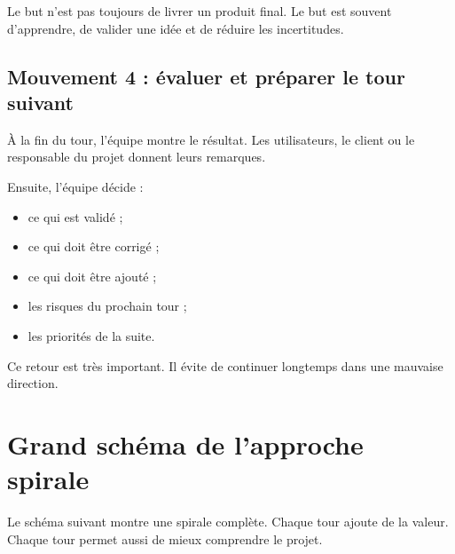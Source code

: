 \documentclass[12pt,a4paper]{article}
\begin{document}
Le but n'est pas toujours de livrer un produit final. Le but est souvent d'apprendre, de valider une idée et de réduire les incertitudes.

\subsection{Mouvement 4 : évaluer et préparer le tour suivant}

À la fin du tour, l'équipe montre le résultat. Les utilisateurs, le client ou le responsable du projet donnent leurs remarques.

Ensuite, l'équipe décide :

\begin{itemize}
    \item ce qui est validé ;
    \item ce qui doit être corrigé ;
    \item ce qui doit être ajouté ;
    \item les risques du prochain tour ;
    \item les priorités de la suite.
\end{itemize}

Ce retour est très important. Il évite de continuer longtemps dans une mauvaise direction.

\newpage

\section{Grand schéma de l'approche spirale}

Le schéma suivant montre une spirale complète. Chaque tour ajoute de la valeur. Chaque tour permet aussi de mieux comprendre le projet.
\end{document}
